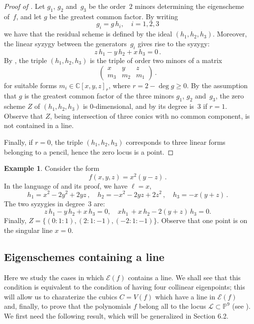 \documentclass[a4paper, 11pt, reqno]{amsart}
\theoremstyle{plain}
\theoremstyle{definition}
\newtheorem{es}[lemma]{Example}
\newcommand{\C}{\mathbb{C}}
\newcommand{\p}{\mathbb{P}}
\newcommand{\sL}{\mathcal{L}}
\newcommand{\Eig}[1]{\mathcal{E}\!\left( {#1} \right)}
\begin{document}
\begin{proof}[Proof of ]
Let $g_1$, $g_2$ and~$g_3$ be the order~$2$ minors determining the eigenscheme of~$f$, and let $g$ be the greatest common factor.
By writing
%
\[
  g_i = g \, h_i, \quad i=1,2,3
\]
%
we have that the residual scheme is defined by the ideal
$(h_1,h_2,h_3)$. Moreover, the linear
syzygy between the generators~$g_i$ gives rise to the syzygy:
%
\[
  z\, h_1 - y\, h_2 + x\, h_3 = 0 \,.
\]
%
By , the triple $(h_1,h_2,h_3)$ is the triple of order two minors of a matrix
%
\[
  \begin{pmatrix}
    x & y & z \\
    m_3 & m_2 & m_1
  \end{pmatrix} \,.
\]
%
for suitable forms $m_i \in \C[x,y,z]_r$, where $r =2 - \deg g \ge 0$.
By the assumption that $g$ is the greatest common factor of the three minors $g_1$, $g_2$ and~$g_3$, the zero scheme $Z$ of $(h_1,h_2,h_3)$ is $0$-dimensional, and
by  its degree is~$3$ if $r=1$. Observe that $Z$, being intersection of three conics with no common component, is not contained in a line. 

Finally, if $r=0$, the triple $(h_1,h_2,h_3)$ corresponds to three linear forms belonging to a pencil, hence the zero locus is a point.
\end{proof}


\begin{es}
Consider the form
%
\[
  f(x, y, z) = x^2 (y - z) \,.
\]
%
In the language of  and its proof, we have $\ell=x$,
%
\[
 h_1 = x^2-2y^2+2yz \,, \quad 
 h_2 = -x^2-2yz+2z^2\,, \quad 
 h_3 =-x(y+z) \,.
\]
%
The two syzygies in degree~$3$ are:
%
\[
  z \, h_1 - y \, h_2 + x \, h_3 = 0, \quad 
  xh_1 \, +x\,h_2 - 2(y+z) \, h_3 = 0.
\]
%
Finally, $Z = \{ (0:1:1),(2:1:-1),(-2:1:-1) \}$.
Observe that one point is on the singular line $x=0$.
\end{es}


\subsection{Eigenschemes containing a line}
Here we study the cases in which $\Eig{f}$ contains a line. We shall see that
this condition is equivalent to the condition of having four collinear
eigenpoints; this will allow us to charaterize the cubics $C = V(f)$ which have a line
in $\Eig{f}$ and, finally, to prove that the polynomials $f$
belong all to the locus $\sL \subset \p^9$ (see ).
We first need the following result, which will be generalized in Section 6.2.
\end{document}
